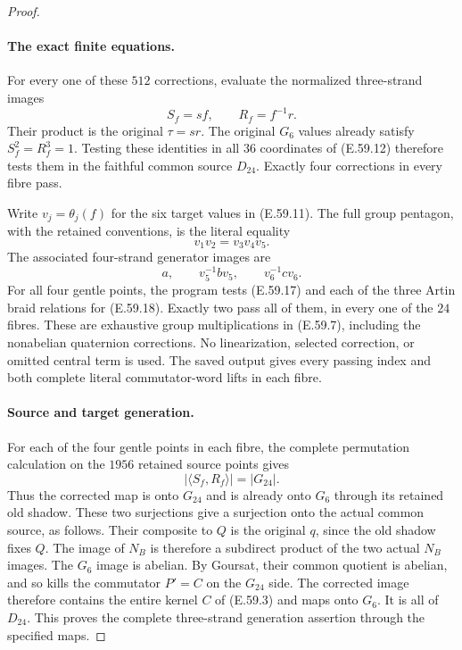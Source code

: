 \begin{proof}
\paragraph{The exact finite equations.}
For every one of these $512$ corrections, evaluate the normalized
three-strand images
\[
                      S_f=sf,\qquad R_f=f^{-1}r.
 \tag{E.59.16}
\]
Their product is the original $\tau=sr$. The original $G_6$ values
already satisfy $S_f^2=R_f^3=1$. Testing these identities in all
$36$ coordinates of \textup{(E.59.12)} therefore tests them in
the faithful common source $D_{24}$. Exactly four corrections
in every fibre pass.

Write $v_j=\theta_j(f)$ for the six target values in
\textup{(E.59.11)}. The full group pentagon, with the retained
conventions, is the literal equality
\[
                  v_1v_2=v_3v_4v_5.
 \tag{E.59.17}
\]
The associated four-strand generator images are
\[
                  a,\qquad v_5^{-1}bv_5,\qquad v_6^{-1}cv_6.
 \tag{E.59.18}
\]
For all four gentle points, the program tests
\textup{(E.59.17)} and each of the three Artin braid relations
for \textup{(E.59.18)}. Exactly two pass all of them, in every
one of the $24$ fibres. These are exhaustive group multiplications
in \textup{(E.59.7)}, including the nonabelian quaternion
corrections. No linearization, selected correction, or omitted
central term is used. The saved output gives every passing index
and both complete literal commutator-word lifts in each fibre.

\paragraph{Source and target generation.}
For each of the four gentle points in each fibre, the complete
permutation calculation on the $1956$ retained source points gives
\[
                  |\langle S_f,R_f\rangle|=|G_{24}|.
 \tag{E.59.19}
\]
Thus the corrected map is onto $G_{24}$ and is already onto $G_6$
through its retained old shadow. These two surjections give a
surjection onto the actual common source, as follows. Their
composite to $Q$ is the original $q$, since the old shadow fixes
$Q$. The image of $N_B$ is therefore a subdirect product of the
two actual $N_B$ images. The $G_6$ image is abelian. By Goursat,
their common quotient is abelian, and so kills the commutator
$P'=C$ on the $G_{24}$ side. The corrected image therefore
contains the entire kernel $C$ of \textup{(E.59.3)} and maps onto
$G_6$. It is all of $D_{24}$. This proves the complete
three-strand generation assertion through the specified maps.


\end{proof}
